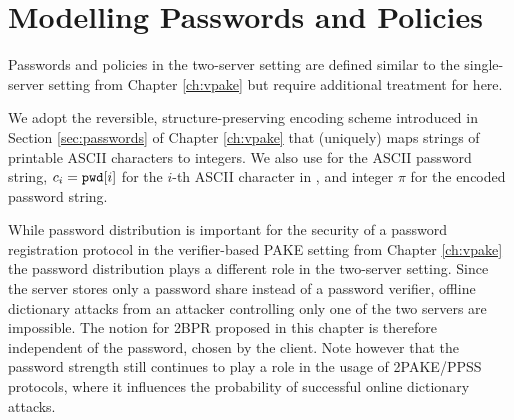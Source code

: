 \section{Modelling Passwords and Policies}
Passwords and policies in the two-server setting are defined similar to the single-server setting from Chapter \ref{ch:vpake} but require additional treatment for here.

We adopt the reversible, structure-preserving encoding scheme introduced in Section \ref{sec:passwords} of Chapter \ref{ch:vpake} that (uniquely) maps strings of printable \ac{ASCII} characters to integers.
We also use \pwd for the \ac{ASCII} password string, $c_i=\mathtt{pwd}[i]$ for the $i$-th \ac{ASCII} character in \pwd, and integer $\pi$ for the encoded password string.

\begin{remark}\label{rem:passwords}
While password distribution is important for the security of a password registration protocol in the verifier-based PAKE setting from Chapter \ref{ch:vpake} the password distribution plays a different role in the two-server setting.
Since the server stores only a password share instead of a password verifier, offline dictionary attacks from an attacker controlling only one of the two servers are impossible.
The notion for \ac{2BPR} proposed in this chapter is therefore independent of the password, chosen by the client.
Note however that the password strength still continues to play a role in the usage of \ac{2PAKE}/\ac{PPSS} protocols, where it influences the probability of successful online dictionary attacks.
\end{remark}

